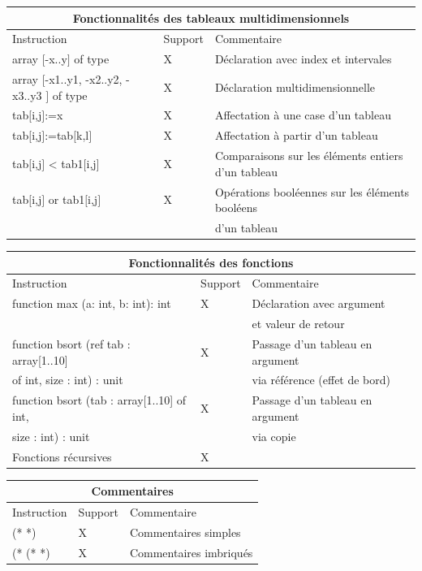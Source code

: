 \documentclass[a4paper]{article}
\begin{document}
\begin{center}
\begin{tabular}{|l|l|l|}
  \hline
  \multicolumn{3}{|c|}{Fonctionnalités des tableaux multidimensionnels} \\
  \hline
  Instruction & Support & Commentaire \\
  \hline
  array $[$-x..y$]$ of type & X & Déclaration avec index et intervales \\
  array $[$-x1..y1, -x2..y2, -x3..y3 $]$ of type & X & Déclaration multidimensionnelle \\
  tab$[$i,j$]$:=x & X & Affectation à une case d'un tableau \\
  tab$[$i,j$]$:=tab$[$k,l$]$ & X & Affectation à partir d'un tableau \\
  tab$[$i,j$]$ < tab1$[$i,j$]$ & X & Comparaisons sur les éléments entiers d'un tableau \\
  tab$[$i,j$]$ or tab1$[$i,j$]$ & X & Opérations booléennes sur les éléments booléens \\ & & d'un tableau \\
  \hline
\end{tabular}

\begin{tabular}{|l|l|l|}
  \hline
  \multicolumn{3}{|c|}{Fonctionnalités des fonctions} \\
  \hline
  Instruction & Support & Commentaire \\
  \hline
  function max (a: int, b: int): int  & X & Déclaration avec argument\\
  & & et valeur de retour \\
  function bsort (ref tab : array[1..10] & X & Passage d'un tableau en argument \\
  of int, size : int) : unit  & & via référence (effet de bord)\\
  function bsort (tab : array[1..10] of int, & X & Passage d'un tableau en argument \\
   size : int) : unit  & & via copie \\
  Fonctions récursives & X & \\
  \hline
\end{tabular}

\begin{tabular}{|l|l|l|}
  \hline
  \multicolumn{3}{|c|}{Commentaires} \\
  \hline
  Instruction & Support & Commentaire \\
  \hline
  (* *) & X & Commentaires simples \\
  (* (* *) & X & Commentaires imbriqués \\
  \hline
\end{tabular}


\end{center}
\end{document}
